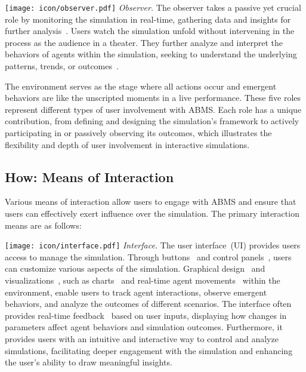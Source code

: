 \texttt{[image: icon/observer.pdf]}
\textit{Observer.}
The observer takes a passive yet crucial role by monitoring the simulation in real-time, gathering data and insights for further analysis~\cite{NEURIPS2023_a3621ee9,10.1145/3544548.3580688}.
Users watch the simulation unfold without intervening in the process as the audience in a theater.
They further analyze and interpret the behaviors of agents within the simulation, seeking to understand the underlying patterns, trends, or outcomes~\cite{10520238,electronics12122722,hua2024warpeacewaragentlarge}.

The environment serves as the stage where all actions occur and emergent behaviors are like the unscripted moments in a live performance. 
These five roles represent different types of user involvement with ABMS. 
Each role has a unique contribution, from defining and designing the simulation’s framework to actively participating in or passively observing its outcomes, which illustrates the flexibility and depth of user involvement in interactive simulations.


\subsection{How: Means of Interaction}
Various means of interaction allow users to engage with ABMS and ensure that users can effectively exert influence over the simulation.
The primary interaction means are as follows:


\texttt{[image: icon/interface.pdf]}
\textit{Interface.}
The user interface~(UI) provides users access to manage the simulation.
Through buttons~\cite{chen2023agentversefacilitatingmultiagentcollaboration} and control panels~\cite{kovač2023socialaischoolinsightsdevelopmental}, users can customize various aspects of the simulation.
Graphical design~\cite{lin2023agentsimsopensourcesandboxlarge} and visualizations~\cite{pan2024agentcoordvisuallyexploringcoordination}, such as charts~\cite{10520238} and real-time agent movements~\cite{10.1145/3613904.3642159} within the environment, enable users to track agent interactions, observe emergent behaviors, and analyze the outcomes of different scenarios.
The interface often provides real-time feedback~\cite{chan2023chatevalbetterllmbasedevaluators} based on user inputs, displaying how changes in parameters affect agent behaviors and simulation outcomes.
Furthermore, it provides users with an intuitive and interactive way to control and analyze simulations, facilitating deeper engagement with the simulation and enhancing the user’s ability to draw meaningful insights.

